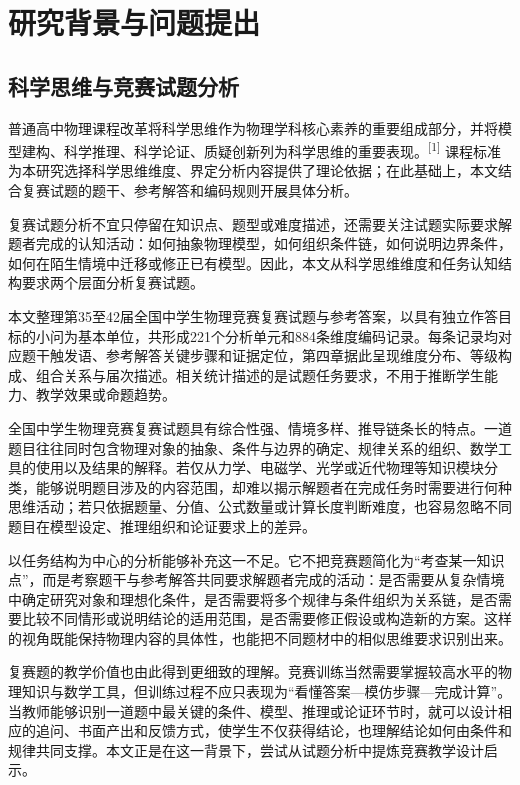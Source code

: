 \documentclass[
  12pt,
  a4paper,twoside,openany]{ctexbook}
\begin{document}
\section{研究背景与问题提出}\label{ux7814ux7a76ux80ccux666fux4e0eux95eeux9898ux63d0ux51fa}

\subsection{科学思维与竞赛试题分析}\label{ux79d1ux5b66ux601dux7ef4ux4e0eux7adeux8d5bux8bd5ux9898ux5206ux6790}

普通高中物理课程改革将科学思维作为物理学科核心素养的重要组成部分，并将模型建构、科学推理、科学论证、质疑创新列为科学思维的重要表现。\textsuperscript{[1]}
课程标准为本研究选择科学思维维度、界定分析内容提供了理论依据；在此基础上，本文结合复赛试题的题干、参考解答和编码规则开展具体分析。

复赛试题分析不宜只停留在知识点、题型或难度描述，还需要关注试题实际要求解题者完成的认知活动：如何抽象物理模型，如何组织条件链，如何说明边界条件，如何在陌生情境中迁移或修正已有模型。因此，本文从科学思维维度和任务认知结构要求两个层面分析复赛试题。

本文整理第35至42届全国中学生物理竞赛复赛试题与参考答案，以具有独立作答目标的小问为基本单位，共形成221个分析单元和884条维度编码记录。每条记录均对应题干触发语、参考解答关键步骤和证据定位，第四章据此呈现维度分布、等级构成、组合关系与届次描述。相关统计描述的是试题任务要求，不用于推断学生能力、教学效果或命题趋势。

全国中学生物理竞赛复赛试题具有综合性强、情境多样、推导链条长的特点。一道题目往往同时包含物理对象的抽象、条件与边界的确定、规律关系的组织、数学工具的使用以及结果的解释。若仅从力学、电磁学、光学或近代物理等知识模块分类，能够说明题目涉及的内容范围，却难以揭示解题者在完成任务时需要进行何种思维活动；若只依据题量、分值、公式数量或计算长度判断难度，也容易忽略不同题目在模型设定、推理组织和论证要求上的差异。

以任务结构为中心的分析能够补充这一不足。它不把竞赛题简化为``考查某一知识点''，而是考察题干与参考解答共同要求解题者完成的活动：是否需要从复杂情境中确定研究对象和理想化条件，是否需要将多个规律与条件组织为关系链，是否需要比较不同情形或说明结论的适用范围，是否需要修正假设或构造新的方案。这样的视角既能保持物理内容的具体性，也能把不同题材中的相似思维要求识别出来。

复赛题的教学价值也由此得到更细致的理解。竞赛训练当然需要掌握较高水平的物理知识与数学工具，但训练过程不应只表现为``看懂答案---模仿步骤---完成计算''。当教师能够识别一道题中最关键的条件、模型、推理或论证环节时，就可以设计相应的追问、书面产出和反馈方式，使学生不仅获得结论，也理解结论如何由条件和规律共同支撑。本文正是在这一背景下，尝试从试题分析中提炼竞赛教学设计启示。
\end{document}
